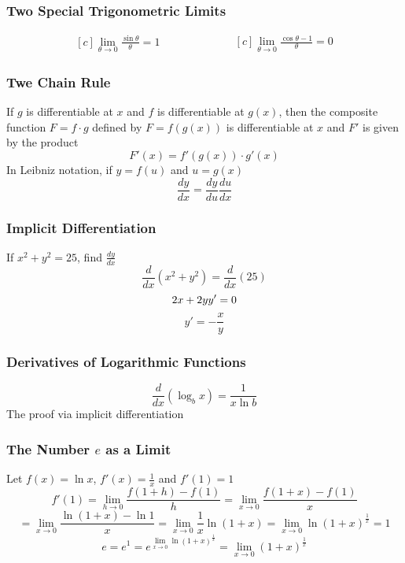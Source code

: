 \documentclass{article}
\begin{document}
\subsubsection*{Two Special Trigonometric Limits}
\begin{equation*}
\begin{aligned}[c]
\lim_{\theta \to 0} \frac{\sin \theta}{\theta} = 1
\end{aligned}
\qquad\qquad\qquad
\begin{aligned}[c]
\lim_{\theta \to 0} \frac{\cos \theta - 1}{\theta} = 0
\end{aligned}
\end{equation*}

\subsubsection*{Twe Chain Rule}
If \(g\) is differentiable at \(x\) and \(f\) is differentiable at \(g(x)\), then the composite function \(F=f \cdot g\) defined by \(F = f(g(x)) \) is differentiable at \(x\) and \(F'\) is given by the product
\[
F'(x) = f'(g(x)) \cdot g'(x)
\]
In Leibniz notation, if \(y = f(u)\) and \(u = g(x)\)
\[
\frac{dy}{dx} = \frac{dy}{du} \frac{du}{dx}
\]

\subsubsection*{Implicit Differentiation}
If \(x^2 + y^2 = 25\), find \( \frac{dy}{dx} \)
\[
\frac{d}{dx}(x^2 + y^2)=\frac{d}{dx}(25)
\]
\[
2x + 2y y' = 0 \\
\]
\[
y' = -\frac{x}{y}
\]
\subsubsection*{Derivatives of Logarithmic Functions}
\[
\frac{d}{dx}(\log_b x)=\frac{1}{x \ln b}
\]
The proof via implicit differentiation

\subsubsection*{The Number \(e\) as a Limit}
Let \(f(x)=\ln x\), \(f'(x)=\frac{1}{x} \) and \(f'(1)=1\)
\[
f'(1) = \lim_{h \to 0} \frac{f(1+h)-f(1)}{h} = \lim_{x \to 0} \frac{f(1+x)-f(1)}{x}
\]
\[
= \lim_{x \to 0} \frac{\ln (1+x) -\ln 1}{x} = \lim_{x \to 0} \frac{1}{x} \ln (1+x) = \lim_{x \to 0} \ln (1+x)^\frac{1}{x}=1
\]
\[
e = e^1 = e^{\lim_{x \to 0} \ln (1+x)^ \frac{1}{x}} = \lim_{x \to 0} (1+x)^ \frac{1}{x}
\]
\end{document}
